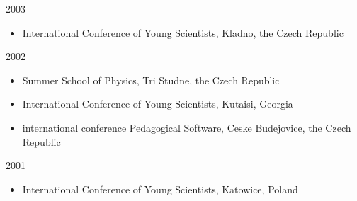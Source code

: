 \documentclass[a4paper,10pt]{article}
\newenvironment{packedenum}{
\begin{itemize}
  \setlength{\itemsep}{0pt}
  \setlength{\parskip}{0pt}
  \setlength{\parsep}{0pt}
}{\end{itemize}}
\begin{document}
{2003}
\begin{packedenum}
\item International Conference of Young Scientists, Kladno, the Czech Republic
\end{packedenum}

{2002}
\begin{packedenum}
\item Summer School of Physics, Tri Studne, the Czech Republic
\item International Conference of Young Scientists, Kutaisi, Georgia
\item international conference Pedagogical Software, Ceske Budejovice,
  the Czech Republic
\end{packedenum}

{2001}
\begin{packedenum}
\item International Conference of Young Scientists, Katowice, Poland
\end{packedenum}
\end{document}
